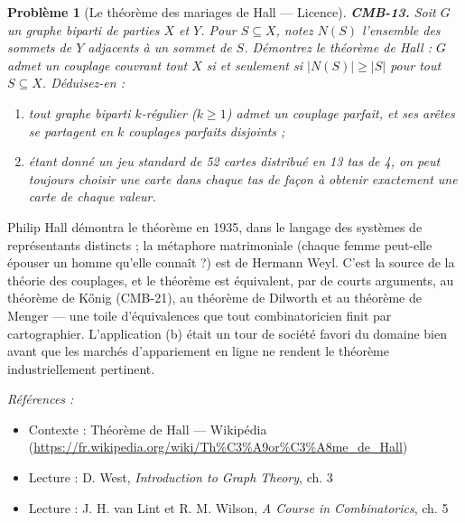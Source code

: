 \documentclass[11pt]{article}
\newtheorem{problem}{Problème}
\newenvironment{refs}{\par\small\noindent\emph{Références :}\begin{itemize}\setlength\itemsep{0pt}}{\end{itemize}\normalsize}
\begin{document}
\bigskip

\begin{problem}[{Le théorème des mariages de Hall --- Licence}]
\textbf{CMB-13.} Soit $ G $ un graphe biparti de parties $ X $ et $ Y $. Pour
$ S \subseteq X $, notez $ N(S) $ l'ensemble des sommets de $ Y $ adjacents à un sommet de
$ S $. Démontrez le théorème de Hall : $ G $ admet un couplage couvrant tout $ X $ si et
seulement si $ |N(S)| \ge |S| $ pour tout $ S \subseteq X $. Déduisez-en :
\begin{enumerate}
\item[(a)] tout graphe biparti $ k $-régulier ($ k \ge 1 $) admet un couplage parfait, et ses arêtes
se partagent en $ k $ couplages parfaits disjoints ;
\item[(b)] étant donné un jeu standard de 52 cartes distribué en 13 tas de 4, on peut toujours choisir
une carte dans chaque tas de façon à obtenir exactement une carte de chaque valeur.
\end{enumerate}

\end{problem}

\noindent Philip Hall démontra le théorème en 1935, dans le langage des \og{} systèmes de
représentants distincts \fg{} ; la métaphore matrimoniale (chaque femme peut-elle épouser un homme
qu'elle connaît ?) est de Hermann Weyl. C'est la source de la théorie des couplages, et le
théorème est équivalent, par de courts arguments, au théorème de K\H{o}nig (CMB-21), au théorème de
Dilworth et au théorème de Menger --- une toile d'équivalences que tout combinatoricien finit par
cartographier. L'application (b) était un tour de société favori du domaine bien avant que les
marchés d'appariement en ligne ne rendent le théorème industriellement pertinent.

\begin{refs}
\item Contexte : Théorème de Hall --- Wikipédia (\url{https://fr.wikipedia.org/wiki/Th%C3%A9or%C3%A8me_de_Hall})
\item Lecture : D. West, \textit{Introduction to Graph Theory}, ch. 3
\item Lecture : J. H. van Lint et R. M. Wilson, \textit{A Course in Combinatorics}, ch. 5
\end{refs}

\bigskip
\end{document}

